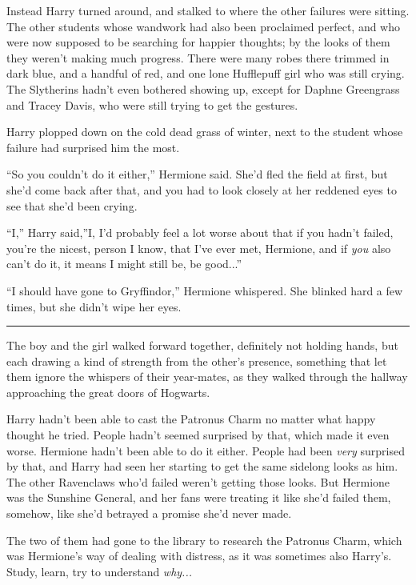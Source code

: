 Instead Harry turned around, and stalked to where the other failures
were sitting. The other students whose wandwork had also been proclaimed
perfect, and who were now supposed to be searching for happier thoughts;
by the looks of them they weren't making much progress. There were many
robes there trimmed in dark blue, and a handful of red, and one lone
Hufflepuff girl who was still crying. The Slytherins hadn't even
bothered showing up, except for Daphne Greengrass and Tracey Davis, who
were still trying to get the gestures.

Harry plopped down on the cold dead grass of winter, next to the student
whose failure had surprised him the most.

``So you couldn't do it either,'' Hermione said. She'd fled the field at
first, but she'd come back after that, and you had to look closely at
her reddened eyes to see that she'd been crying.

``I,'' Harry said,''I, I'd probably feel a lot worse about that if you
hadn't failed, you're the nicest, person I know, that I've ever met,
Hermione, and if \emph{you} also can't do it, it means I might still be,
be good...''

``I should have gone to Gryffindor,'' Hermione whispered. She blinked
hard a few times, but she didn't wipe her eyes.

\begin{center}\rule{3in}{0.4pt}\end{center}

The boy and the girl walked forward together, definitely not holding
hands, but each drawing a kind of strength from the other's presence,
something that let them ignore the whispers of their year-mates, as they
walked through the hallway approaching the great doors of Hogwarts.

Harry hadn't been able to cast the Patronus Charm no matter what happy
thought he tried. People hadn't seemed surprised by that, which made it
even worse. Hermione hadn't been able to do it either. People had been
\emph{very} surprised by that, and Harry had seen her starting to get
the same sidelong looks as him. The other Ravenclaws who'd failed
weren't getting those looks. But Hermione was the Sunshine General, and
her fans were treating it like she'd failed them, somehow, like she'd
betrayed a promise she'd never made.

The two of them had gone to the library to research the Patronus Charm,
which was Hermione's way of dealing with distress, as it was sometimes
also Harry's. Study, learn, try to understand \emph{why...}

